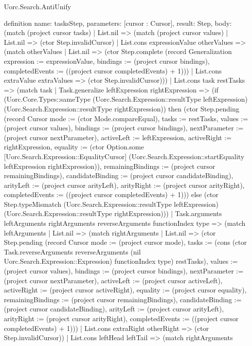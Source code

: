 \begin{lexlean}{Uorc.Search.AntiUnify}
\begin{semanticmodule}
definition{
  name: tasksStep,
  parameters: [cursor : Cursor],
  result: Step,
  body: (match (project cursor tasks)
    | List.nil => (match (project cursor values)
      | List.nil => (ctor Step.invalidCursor)
      | List.cons expressionValue otherValues => (match otherValues
        | List.nil => (ctor Step.complete (record Generalization {expression := expressionValue, bindings := (project cursor bindings), completedEvents := ((project cursor completedEvents) + 1)}))
        | List.cons extraValue extraValues => (ctor Step.invalidCursor)))
    | List.cons task restTasks => (match task
      | Task.generalize leftExpression rightExpression => (if (Uorc.Core.Types::sameType (Uorc.Search.Expression::resultType leftExpression) (Uorc.Search.Expression::resultType rightExpression)) then (ctor Step.pending (record Cursor {mode := (ctor Mode.compareEqual), tasks := restTasks, values := (project cursor values), bindings := (project cursor bindings), nextParameter := (project cursor nextParameter), activeLeft := leftExpression, activeRight := rightExpression, equality := (ctor Option.some [Uorc.Search.Expression::EqualityCursor] (Uorc.Search.Expression::startEquality leftExpression rightExpression)), remainingBindings := (project cursor remainingBindings), candidateBinding := (project cursor candidateBinding), arityLeft := (project cursor arityLeft), arityRight := (project cursor arityRight), completedEvents := ((project cursor completedEvents) + 1)})) else (ctor Step.typeMismatch (Uorc.Search.Expression::resultType leftExpression) (Uorc.Search.Expression::resultType rightExpression)))
      | Task.arguments leftArguments rightArguments reverseArguments functionIndex type => (match leftArguments
        | List.nil => (match rightArguments
          | List.nil => (ctor Step.pending (record Cursor {mode := (project cursor mode), tasks := (cons (ctor Task.reverseArguments reverseArguments (nil Uorc.Search.Expression::Expression) functionIndex type) restTasks), values := (project cursor values), bindings := (project cursor bindings), nextParameter := (project cursor nextParameter), activeLeft := (project cursor activeLeft), activeRight := (project cursor activeRight), equality := (project cursor equality), remainingBindings := (project cursor remainingBindings), candidateBinding := (project cursor candidateBinding), arityLeft := (project cursor arityLeft), arityRight := (project cursor arityRight), completedEvents := ((project cursor completedEvents) + 1)}))
          | List.cons extraRight otherRight => (ctor Step.invalidCursor))
        | List.cons leftHead leftTail => (match rightArguments
}
\end{semanticmodule}
\end{lexlean}

